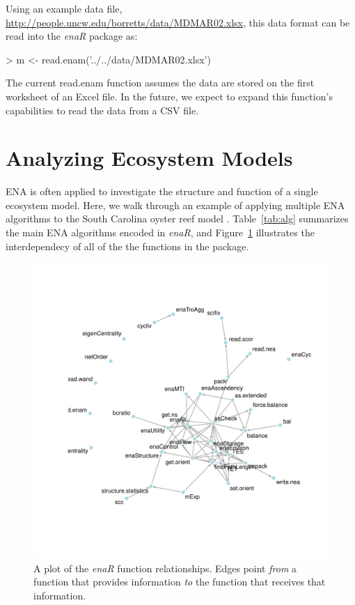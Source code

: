 \documentclass[article]{jss}
\begin{document}
Using an example data file,
\url{http://people.uncw.edu/borretts/data/MDMAR02.xlsx}, this data
format can be read into the \textit{enaR} package as:

\begin{Schunk}
\begin{Sinput}
>   m <- read.enam('../../data/MDMAR02.xlsx')
\end{Sinput}
\end{Schunk}

The current read.enam function assumes the data are stored on the
first worksheet of an Excel file. In the future, we expect to expand
this function's capabilities to read the data from a CSV file.


\section{Analyzing Ecosystem Models}

ENA is often applied to investigate the structure and function of a
single ecosystem model.  Here, we walk through an example of applying
multiple ENA algorithms to the South Carolina oyster reef model
\citep{dame81}.  Table~\ref{tab:alg} summarizes the main ENA
algorithms encoded in \textit{enaR}, and Figure~\ref{fig:depnet}
illustrates the interdependecy of all of the the functions in the
package.

\begin{figure}
  \center
  \includegraphics{images/enaR-vignette-003.pdf}
  \caption{A plot of the \textit{enaR} function relationships. Edges
    point \textit{from} a function that provides information \textit{to}
    the function that receives that information.} \label{fig:depnet}
\end{figure}
\end{document}
